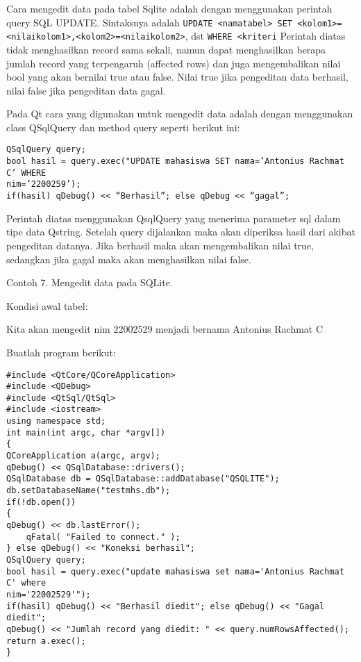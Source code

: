Cara mengedit data pada tabel Sqlite adalah dengan menggunakan perintah
query SQL UPDATE. Sintaksnya adalah
\texttt{UPDATE\ \textless{}namatabel\textgreater{}\ SET\ \textless{}kolom1\textgreater{}=\textless{}nilaikolom1\textgreater{},\textless{}kolom2\textgreater{}=\textless{}nilaikolom2\textgreater{}},
dst \texttt{WHERE\ \textless{}kriteri} Perintah diatas tidak
menghasilkan record sama sekali, namun dapat menghasilkan berapa jumlah
record yang terpengaruh (affected rows) dan juga mengembalikan nilai
bool yang akan bernilai true atau false. Nilai true jika pengeditan data
berhasil, nilai false jika pengeditan data gagal.

Pada Qt cara yang digunakan untuk mengedit data adalah dengan
menggunakan class QSqlQuery dan method query seperti berikut ini:

\begin{verbatim}
QSqlQuery query;
bool hasil = query.exec("UPDATE mahasiswa SET nama=’Antonius Rachmat C’ WHERE
nim=’2200259’);
if(hasil) qDebug() << “Berhasil”; else qDebug << “gagal”;
\end{verbatim}

Perintah diatas menggunakan QsqlQuery yang menerima parameter sql dalam
tipe data Qstring. Setelah query dijalankan maka akan diperiksa hasil
dari akibat pengeditan datanya. Jika berhasil maka akan mengembalikan
nilai true, sedangkan jika gagal maka akan menghasilkan nilai false.

Contoh 7. Mengedit data pada SQLite.

Kondisi awal tabel:

Kita akan mengedit nim 22002529 menjadi bernama Antonius Rachmat C

Buatlah program berikut:

\begin{verbatim}
#include <QtCore/QCoreApplication>
#include <QDebug>
#include <QtSql/QtSql>
#include <iostream>
using namespace std;
int main(int argc, char *argv[])
{
QCoreApplication a(argc, argv);
qDebug() << QSqlDatabase::drivers();
QSqlDatabase db = QSqlDatabase::addDatabase("QSQLITE");
db.setDatabaseName("testmhs.db");
if(!db.open())
{
qDebug() << db.lastError();
    qFatal( "Failed to connect." );
} else qDebug() << "Koneksi berhasil";
QSqlQuery query;
bool hasil = query.exec("update mahasiswa set nama='Antonius Rachmat C' where
nim='22002529'");
if(hasil) qDebug() << "Berhasil diedit"; else qDebug() << "Gagal diedit";
qDebug() << "Jumlah record yang diedit: " << query.numRowsAffected();
return a.exec();
}
\end{verbatim}

